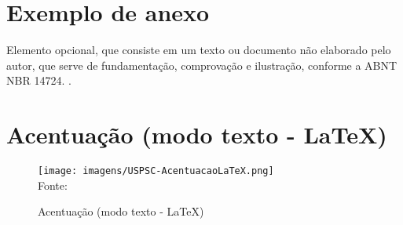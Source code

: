 

\begin{anexosenv}
\noindent \chapter{Exemplo de anexo}
\vfill
\clearpage
Elemento opcional, que consiste em um texto ou documento não elaborado pelo autor, que serve de fundamentação, comprovação e ilustração, conforme a ABNT NBR 14724. \cite{nbr14724}.



\noindent\chapter{Acentuação (modo texto - \LaTeX)}
\vfill
\clearpage
\begin{figure}[H]
	
	\caption{\label{fig_anexob}Acentuação (modo texto - \LaTeX)}
	\texttt{[image: imagens/USPSC-AcentuacaoLaTeX.png]} \\
	Fonte: 

\end{figure}

\end{anexosenv}

